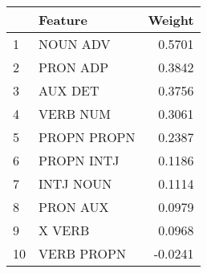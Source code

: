 \begin{tabular}{llr}
\toprule
{} &      Feature &  Weight \\
\midrule
1  &     NOUN ADV &  0.5701 \\
2  &     PRON ADP &  0.3842 \\
3  &      AUX DET &  0.3756 \\
4  &     VERB NUM &  0.3061 \\
5  &  PROPN PROPN &  0.2387 \\
6  &   PROPN INTJ &  0.1186 \\
7  &    INTJ NOUN &  0.1114 \\
8  &     PRON AUX &  0.0979 \\
9  &       X VERB &  0.0968 \\
10 &   VERB PROPN & -0.0241 \\
\bottomrule
\end{tabular}
